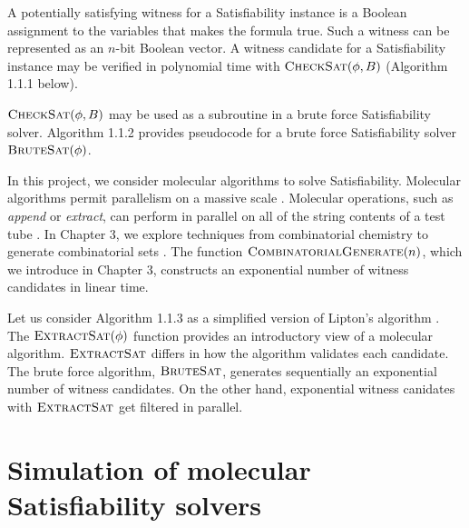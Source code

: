 A potentially satisfying witness for a {\sc Satisfiability} instance is a Boolean assignment to the variables that makes the formula true.  Such a witness can be represented as an $n$-bit Boolean vector.  A witness candidate for a {\sc Satisfiability} instance may be verified in polynomial time with $\text{\sc CheckSat}(\phi, B)$ (Algorithm 1.1.1 below).

\FloatBarrier 



\FloatBarrier 

$\text{\sc CheckSat}(\phi, B)$ may be used as a subroutine in a brute force {\sc Satisfiability} solver.  Algorithm 1.1.2 provides pseudocode for a brute force {\sc Satisfiability} solver $\text{\sc BruteSat}(\phi)$.  

\FloatBarrier 



In this project, we consider molecular algorithms to solve {\sc Satisfiability}.  Molecular algorithms permit parallelism on a massive scale \cite{Adleman:1994:MCS:189441.189442, Lipton95usingdna}.  Molecular operations, such as \textit{append} or \textit{extract}, can perform in parallel on all of the string contents of a test tube \cite{Adleman:1994:MCS:189441.189442, Lipton95usingdna, dnaComputingModels2008}.  In Chapter 3, we explore techniques from combinatorial chemistry to generate combinatorial sets \cite{Lipton95usingdna, furkaBook, dnaComputingModels2008}.  The function $\text{\sc CombinatorialGenerate}(n)$, which we introduce in Chapter 3, constructs an exponential number of witness candidates in linear time.


\FloatBarrier 

Let us consider Algorithm 1.1.3 as a simplified version of Lipton's algorithm \cite{Lipton95usingdna, dnaComputingModels2008}.  The $\text{\sc ExtractSat}(\phi)$ function provides an introductory view of a molecular algorithm.  $\text{\sc ExtractSat}$ differs in how the algorithm validates each candidate.  The brute force algorithm, $\text{\sc BruteSat}$, generates sequentially an exponential number of witness candidates.  On the other hand, exponential witness canidates with $\text{\sc ExtractSat}$ get filtered in parallel.  
				
\section{Simulation of molecular {\sc Satisfiability} solvers}
	

